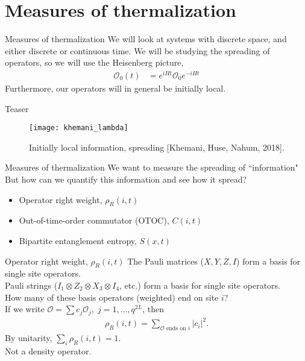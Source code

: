 \documentclass{beamer}
\begin{document}
\section{Measures of thermalization}

\begin{frame}{Measures of thermalization}
We will look at systems with discrete space, and either discrete or continuous time.
We will be studying the spreading of operators, so we will use the Heisenberg picture,
\begin{align}
\mathcal{O}_0(t) &= e^{iHt}\mathcal{O}_0e^{-iHt}\nonumber
\end{align}
Furthermore, our operators will in general be initially local.
\end{frame}

\begin{frame}{Teaser}
\begin{figure}
	\centering
	\texttt{[image: khemani\_lambda]}
	\caption{Initially local information, spreading [Khemani, Huse, Nahum, 2018].}
\end{figure}
\end{frame}

\begin{frame}{Measures of thermalization}
We want to measure the spreading of ``information"\\
But how can we quantify this information and see how it spread?
\begin{itemize}
	\item Operator right weight, $\rho_R(i,t)$
	\item Out-of-time-order commutator (OTOC), $C(i,t)$
	\item Bipartite entanglement entropy, $S(x,t)$
\end{itemize}
\end{frame}

\begin{frame}{Operator right weight, $\rho_R(i,t)$}
The Pauli matrices ($X,Y,Z,I$) form a basis for single site operators. \\
Pauli strings ($I_1\otimes Z_2\otimes X_3\otimes I_4$, etc.) form a basis for single site operators.\\
How many of these basis operators (weighted) end on site $i$?\\
If we write $\mathcal{O} = \sum c_j \mathcal{O}_j,\; j=1,\dots,q^{2L}$, then
\begin{align}
\rho_R(i,t) = \sum_{\mathcal{O} \text{ ends on $i$}}|c_i|^2. \nonumber       
\end{align}
By unitarity, $\sum_i \rho_R(i,t)=1$.\\
Not a density operator.
\end{frame}
\end{document}
